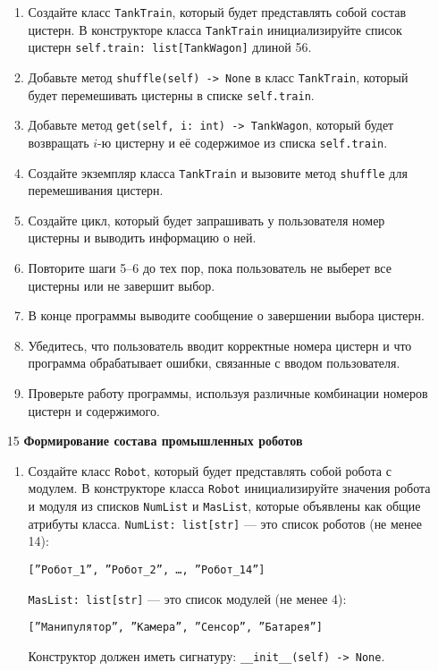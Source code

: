 \begin{enumerate}
\begin{enumerate}
    \item Создайте класс \texttt{TankTrain}, который будет представлять собой состав цистерн. В конструкторе класса \texttt{TankTrain} инициализируйте список цистерн \texttt{self.train: list[TankWagon]} длиной 56.

    \item Добавьте метод \texttt{shuffle(self) -> None} в класс \texttt{TankTrain}, который будет перемешивать цистерны в списке \texttt{self.train}.

    \item Добавьте метод \texttt{get(self, i: int) -> TankWagon}, который будет возвращать $i$-ю цистерну и её содержимое из списка \texttt{self.train}.

    \item Создайте экземпляр класса \texttt{TankTrain} и вызовите метод \texttt{shuffle} для перемешивания цистерн.

    \item Создайте цикл, который будет запрашивать у пользователя номер цистерны и выводить информацию о ней.

    \item Повторите шаги 5–6 до тех пор, пока пользователь не выберет все цистерны или не завершит выбор.

    \item В конце программы выводите сообщение о завершении выбора цистерн.

    \item Убедитесь, что пользователь вводит корректные номера цистерн и что программа обрабатывает ошибки, связанные с вводом пользователя.

    \item Проверьте работу программы, используя различные комбинации номеров цистерн и содержимого.
\end{enumerate}

\item[15] \textbf{Формирование состава промышленных роботов}
\begin{enumerate}
    \item Создайте класс \texttt{Robot}, который будет представлять собой робота с модулем. В конструкторе класса \texttt{Robot} инициализируйте значения робота и модуля из списков \texttt{NumList} и \texttt{MasList}, которые объявлены как общие атрибуты класса. \texttt{NumList: list[str]} — это список роботов (не менее 14): 
    \begin{center}
        \texttt{[''Робот\_1'', ''Робот\_2'', \dots, ''Робот\_14'']}
    \end{center}
    \texttt{MasList: list[str]} — это список модулей (не менее 4):
    \begin{center}
        \texttt{[''Манипулятор'', ''Камера'', ''Сенсор'', ''Батарея'']}
    \end{center}
    Конструктор должен иметь сигнатуру: \texttt{\_\_init\_\_(self) -> None}.


\end{enumerate}
\end{enumerate}
